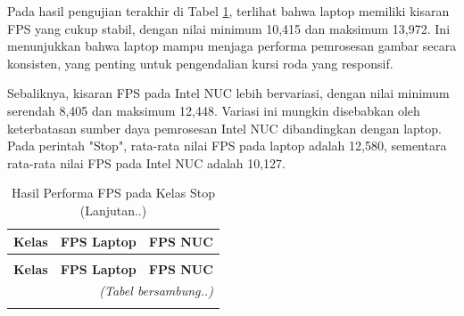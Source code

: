 Pada hasil pengujian terakhir di Tabel \ref{tb:fpsstop}, terlihat bahwa laptop memiliki kisaran FPS yang cukup stabil, dengan nilai minimum 10,415 dan maksimum 13,972. Ini menunjukkan bahwa laptop mampu menjaga performa pemrosesan gambar secara konsisten, yang penting untuk pengendalian kursi roda yang responsif.

Sebaliknya, kisaran FPS pada Intel NUC lebih bervariasi, dengan nilai minimum serendah 8,405 dan maksimum 12,448. Variasi ini mungkin disebabkan oleh keterbatasan sumber daya pemrosesan Intel NUC dibandingkan dengan laptop. Pada perintah "Stop", rata-rata nilai FPS pada laptop adalah 12,580, sementara rata-rata nilai FPS pada Intel NUC adalah 10,127.

\begin{longtable}{|c|c|c|}
  \caption{Hasil Performa FPS pada Kelas Stop}
  \label{tb:fpsstop} \\ 
  \hline
  \rowcolor[HTML]{C0C0C0} 
  \textbf{Kelas} & \textbf{FPS Laptop} & \textbf{FPS NUC} \\ 
  \hline
  \endfirsthead

  \caption[]{Hasil Performa FPS pada Kelas Stop (Lanjutan..)} \\
  \hline
  \rowcolor[HTML]{C0C0C0} 
  \textbf{Kelas} & \textbf{FPS Laptop} & \textbf{FPS NUC} \\ 
  \hline
  \endhead

  \hline
  \multicolumn{3}{r}{\textit{(Tabel bersambung..)}} \\ 
  \endfoot

  \hline
  \endlastfoot


\end{longtable}
